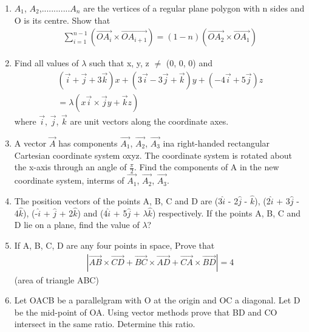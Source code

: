 \begin{enumerate}[label=\arabic*.,ref=\thesubsection.\theenumi]
\item $A_1$, $A_2$,............$A_n$ are the vertices of a regular plane polygon with n sides and O is its centre. Show that 
\begin{align*}
\sum_{i=1}^{n-1} (\overrightarrow{OA_{i}} \times \overrightarrow{OA_{i+1}}) = (1-n)(\overrightarrow{OA_{2}} \times \overrightarrow{OA_{1}})
\end{align*}

\item Find all values of $\lambda$ such that x, y, z $\neq$ (0, 0, 0) and 
\begin{align*}
(\overrightarrow{i} + \overrightarrow{j} + 3\overrightarrow{k})x + (3\overrightarrow{i} - 3\overrightarrow{j} + \overrightarrow{k})y + (-4\overrightarrow{i} + 5\overrightarrow{j})z\\
 = \lambda(x\overrightarrow{i} \times \overrightarrow{j}y + \overrightarrow{k}z)
\end{align*}
where $\overrightarrow{i}$, $\overrightarrow{j}$, $\overrightarrow{k}$ are unit vectors along the coordinate axes.

\item A vector $\overrightarrow{A}$ has components $\overrightarrow{A_1}$, $\overrightarrow{A_2}$, $\overrightarrow{A_3}$ ina right-handed rectangular Cartesian coordinate system oxyz. The coordinate system is rotated about the x-axis through an angle of $\frac{\pi}{2}$. Find the components of A in the new coordinate system, interms of $\overrightarrow{A_1}$, 
$\overrightarrow{A_2}$, $\overrightarrow{A_3}$.

\item The position vectors of the points A, B, C and D are (3$\hat{i}$ - 2$\hat{j}$ - $\hat{k}$), (2$\hat{i}$ + 3$\hat{j}$ - 4$\hat{k}$), (-$\hat{i}$ + $\hat{j}$ + 2$\hat{k}$) and (4$\hat{i}$ + 5$\hat{j}$ + $\lambda\hat{k}$) respectively. If the points A, B, C and D lie on a plane, find the value of $\lambda$?

\item If A, B, C, D are any four points in space, Prove that
\begin{align*}
|\overrightarrow{AB} \times \overrightarrow{CD} + \overrightarrow{BC} \times \overrightarrow{AD} + \overrightarrow{CA} \times \overrightarrow{BD}|=4
\end{align*}  
(area of triangle ABC)

\item Let OACB be a parallelgram with O at the origin and OC a diagonal. Let D be the mid-point of OA. Using vector methods prove that BD and CO intersect in the same ratio. Determine this ratio.


\end{enumerate}
